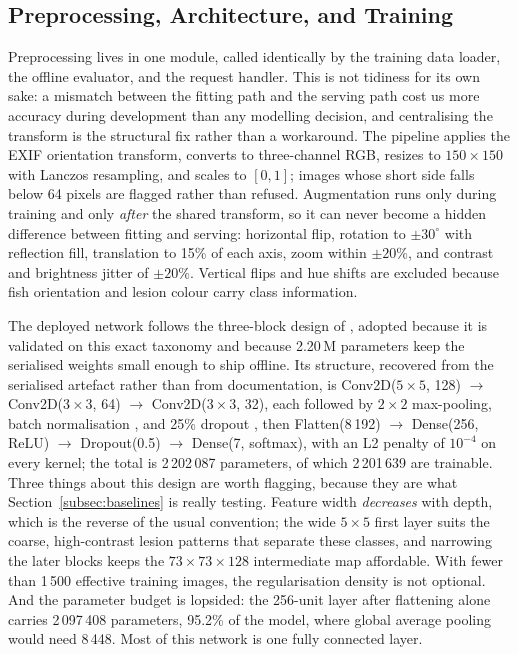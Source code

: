 \documentclass[conference]{IEEEtran}
\begin{document}
\subsection{Preprocessing, Architecture, and Training}
\label{subsec:preproc}

Preprocessing lives in one module, called identically by the training data loader, the offline evaluator, and the request handler. This is not tidiness for its own sake: a mismatch between the fitting path and the serving path cost us more accuracy during development than any modelling decision, and centralising the transform is the structural fix rather than a workaround. The pipeline applies the EXIF orientation transform, converts to three-channel RGB, resizes to $150\times150$ with Lanczos resampling, and scales to $[0,1]$; images whose short side falls below 64 pixels are flagged rather than refused. Augmentation runs only during training and only \emph{after} the shared transform, so it can never become a hidden difference between fitting and serving: horizontal flip, rotation to $\pm30^{\circ}$ with reflection fill, translation to 15\% of each axis, zoom within $\pm20\%$, and contrast and brightness jitter of $\pm20\%$. Vertical flips and hue shifts are excluded because fish orientation and lesion colour carry class information.


The deployed network follows the three-block design of \cite{b1}, adopted because it is validated on this exact taxonomy and because 2.20\,M parameters keep the serialised weights small enough to ship offline. Its structure, recovered from the serialised artefact rather than from documentation, is Conv2D($5\times5$, 128) $\rightarrow$ Conv2D($3\times3$, 64) $\rightarrow$ Conv2D($3\times3$, 32), each followed by $2\times2$ max-pooling, batch normalisation \cite{b28}, and 25\% dropout \cite{b27}, then Flatten(8\,192) $\rightarrow$ Dense(256, ReLU) $\rightarrow$ Dropout(0.5) $\rightarrow$ Dense(7, softmax), with an L2 penalty of $10^{-4}$ on every kernel; the total is 2\,202\,087 parameters, of which 2\,201\,639 are trainable. Three things about this design are worth flagging, because they are what Section~\ref{subsec:baselines} is really testing. Feature width \emph{decreases} with depth, which is the reverse of the usual convention; the wide $5\times5$ first layer suits the coarse, high-contrast lesion patterns that separate these classes, and narrowing the later blocks keeps the $73\times73\times128$ intermediate map affordable. With fewer than 1\,500 effective training images, the regularisation density is not optional. And the parameter budget is lopsided: the 256-unit layer after flattening alone carries 2\,097\,408 parameters, 95.2\% of the model, where global average pooling would need 8\,448. Most of this network is one fully connected layer.
\end{document}
